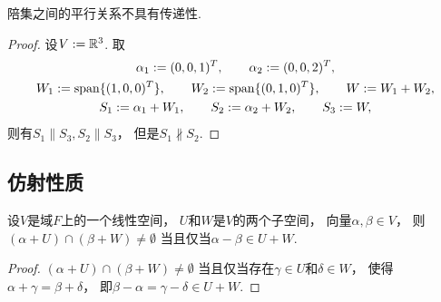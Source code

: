 \begin{property}
陪集之间的平行关系不具有传递性.
\begin{proof}
设\(V := \mathbb{R}^3\).
取\begin{gather*}
	\alpha_1 := (0,0,1)^T,
	\qquad
	\alpha_2 := (0,0,2)^T, \\
	W_1 := \operatorname{span}\{(1,0,0)^T\},
	\qquad
	W_2 := \operatorname{span}\{(0,1,0)^T\},
	\qquad
	W := W_1 + W_2, \\
	S_1 := \alpha_1 + W_1,
	\qquad
	S_2 := \alpha_2 + W_2,
	\qquad
	S_3 := W,
\end{gather*}
则有\(
	S_1 \parallel S_3,
	S_2 \parallel S_3
\)，
但是\(S_1 \nparallel S_2\).
\end{proof}
\end{property}

\subsection{仿射性质}
\begin{theorem}\label{theorem:仿射几何.陪集的交非空的充分必要条件1}
设\(V\)是域\(F\)上的一个线性空间，
\(U\)和\(W\)是\(V\)的两个子空间，
向量\(\alpha,\beta \in V\)，
则\((\alpha + U) \cap (\beta + W) \neq \emptyset\)
当且仅当\(\alpha - \beta \in U + W\).
\begin{proof}
\((\alpha + U) \cap (\beta + W) \neq \emptyset\)
当且仅当存在\(\gamma \in U\)和\(\delta \in W\)，
使得\(\alpha + \gamma = \beta + \delta\)，
即\(\beta - \alpha = \gamma - \delta \in U + W\).
\end{proof}
\end{theorem}

